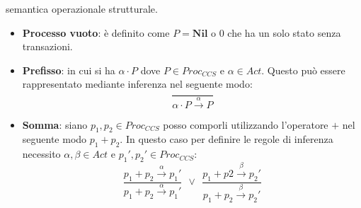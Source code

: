 semantica operazionale strutturale.
\begin{itemize}
    \item \textbf{Processo vuoto}: è definito come $P = \textbf{Nil}$ o 0 che ha
          un solo stato senza transazioni.
          \begin{center}
          \end{center}
    \item \textbf{Prefisso}: in cui si ha $\alpha \cdot P$ dove $P \in Proc_{CCS}$
          e $\alpha \in Act$. Questo può essere rappresentato mediante inferenza
          nel seguente modo:
          \begin{equation}
              \frac{}{\alpha \cdot P \xrightarrow{\alpha} P}
          \end{equation}
          \begin{center}
          \end{center}
    \item \textbf{Somma}: siano $p_1, p_2 \in Proc_{CCS}$ posso comporli
          utilizzando l'operatore $+$ nel seguente modo $p_1 + p_2$. In questo
          caso per definire le regole di inferenza necessito $\alpha, \beta \in
              Act$ e $p_1', p_2' \in Proc_{CCS}$:
          \begin{equation}
              \frac{p_1 + p_2 \xrightarrow{\alpha} p_1'}{p_1 + p_2
                  \xrightarrow{\alpha} p_1'}
              \ \ \lor \ \
              \frac{p_1 + p2 \xrightarrow{\beta} p_2'}{p_1 + p_2
                  \xrightarrow{\beta} p_2'}
          \end{equation}
          \begin{center}
\end{center}
\end{itemize}
